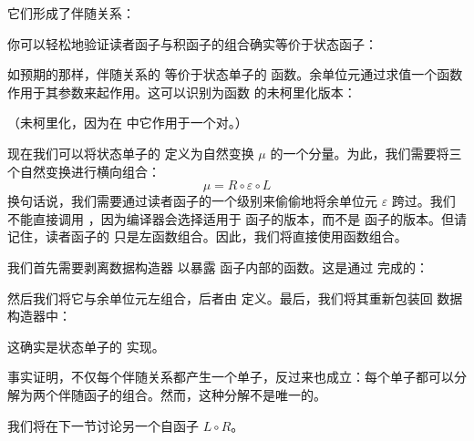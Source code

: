 它们形成了伴随关系：

你可以轻松地验证读者函子与积函子的组合确实等价于状态函子：

如预期的那样，伴随关系的  等价于状态单子的  函数。余单位元通过求值一个函数作用于其参数来起作用。这可以识别为函数  的未柯里化版本：

（未柯里化，因为在  中它作用于一个对。）

现在我们可以将状态单子的  定义为自然变换 $\mu$ 的一个分量。为此，我们需要将三个自然变换进行横向组合：
\[\mu = R \circ \varepsilon \circ L\]
换句话说，我们需要通过读者函子的一个级别来偷偷地将余单位元 $\varepsilon$ 跨过。我们不能直接调用 ，因为编译器会选择适用于  函子的版本，而不是  函子的版本。但请记住，读者函子的  只是左函数组合。因此，我们将直接使用函数组合。

我们首先需要剥离数据构造器  以暴露  函子内部的函数。这是通过  完成的：

然后我们将它与余单位元左组合，后者由  定义。最后，我们将其重新包装回  数据构造器中：

这确实是状态单子的  实现。

事实证明，不仅每个伴随关系都产生一个单子，反过来也成立：每个单子都可以分解为两个伴随函子的组合。然而，这种分解不是唯一的。

我们将在下一节讨论另一个自函子 $L \circ R$。
